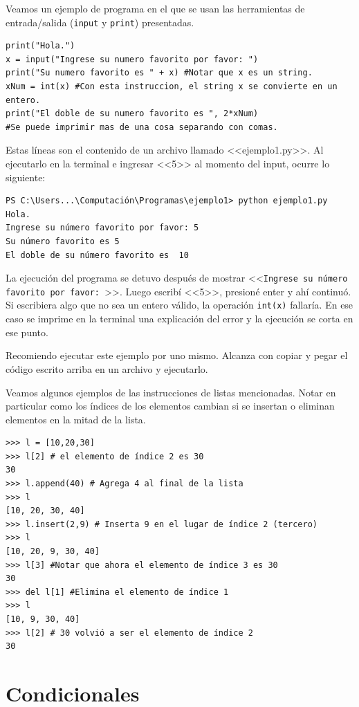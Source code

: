 \documentclass[a4paper, 12pt]{report}
\theoremstyle{definition}
\begin{document}
Veamos un ejemplo de programa en el que se usan las herramientas de entrada/salida ({\tt input} y {\tt print}) presentadas.
\begin{verbatim}
print("Hola.")
x = input("Ingrese su numero favorito por favor: ")
print("Su numero favorito es " + x) #Notar que x es un string.
xNum = int(x) #Con esta instruccion, el string x se convierte en un entero.
print("El doble de su numero favorito es ", 2*xNum)
#Se puede imprimir mas de una cosa separando con comas.
\end{verbatim}
Estas líneas son el contenido de un archivo llamado <<ejemplo1.py>>. Al ejecutarlo en la terminal e ingresar <<5>> al momento del input, ocurre lo siguiente:
\begin{verbatim}
PS C:\Users...\Computación\Programas\ejemplo1> python ejemplo1.py
Hola.
Ingrese su número favorito por favor: 5
Su número favorito es 5
El doble de su número favorito es  10
\end{verbatim}
La ejecución del programa se detuvo después de mostrar <<{\tt Ingrese su número favorito por favor: }>>. Luego escribí <<5>>, presioné enter y ahí continuó. Si escribiera algo que no sea un entero válido, la operación {\tt int(x)} fallaría. En ese caso se imprime en la terminal una explicación del error y la ejecución se corta en ese punto.

Recomiendo ejecutar este ejemplo por uno mismo. Alcanza con copiar y pegar el código escrito arriba en un archivo y ejecutarlo.

Veamos algunos ejemplos de las instrucciones de listas mencionadas. Notar en particular como los índices de los elementos cambian si se insertan o eliminan elementos en la mitad de la lista.
\begin{verbatim}
>>> l = [10,20,30]
>>> l[2] # el elemento de índice 2 es 30
30
>>> l.append(40) # Agrega 4 al final de la lista
>>> l
[10, 20, 30, 40]
>>> l.insert(2,9) # Inserta 9 en el lugar de índice 2 (tercero)
>>> l
[10, 20, 9, 30, 40]
>>> l[3] #Notar que ahora el elemento de índice 3 es 30
30
>>> del l[1] #Elimina el elemento de índice 1
>>> l
[10, 9, 30, 40]
>>> l[2] # 30 volvió a ser el elemento de índice 2 
30
\end{verbatim}



\section{Condicionales}
\end{document}
